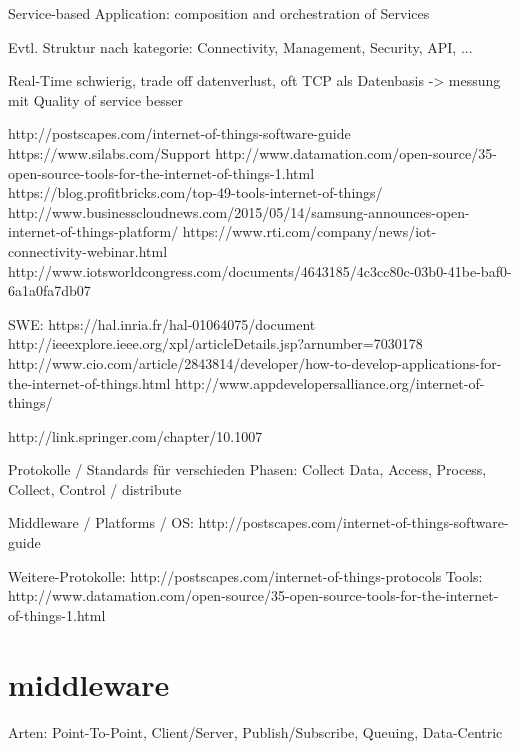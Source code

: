 Service-based Application: composition and orchestration of Services



Evtl. Struktur nach kategorie: Connectivity, Management, Security, API, ...

Real-Time schwierig, trade off datenverlust, oft TCP als Datenbasis -> messung mit Quality of service besser

http://postscapes.com/internet-of-things-software-guide
	https://www.silabs.com/Support%
http://www.datamation.com/open-source/35-open-source-tools-for-the-internet-of-things-1.html
https://blog.profitbricks.com/top-49-tools-internet-of-things/
http://www.businesscloudnews.com/2015/05/14/samsung-announces-open-internet-of-things-platform/
https://www.rti.com/company/news/iot-connectivity-webinar.html
http://www.iotsworldcongress.com/documents/4643185/4c3cc80c-03b0-41be-baf0-6a1a0fa7db07


SWE:
https://hal.inria.fr/hal-01064075/document
http://ieeexplore.ieee.org/xpl/articleDetails.jsp?arnumber=7030178
http://www.cio.com/article/2843814/developer/how-to-develop-applications-for-the-internet-of-things.html
http://www.appdevelopersalliance.org/internet-of-things/

http://link.springer.com/chapter/10.1007%


Protokolle / Standards für verschieden Phasen: Collect Data, Access, Process, Collect, Control / distribute

Middleware / Platforms / OS: http://postscapes.com/internet-of-things-software-guide

Weitere-Protokolle: http://postscapes.com/internet-of-things-protocols
Tools: http://www.datamation.com/open-source/35-open-source-tools-for-the-internet-of-things-1.html

\section{middleware}
Arten: Point-To-Point, Client/Server, Publish/Subscribe, Queuing, Data-Centric